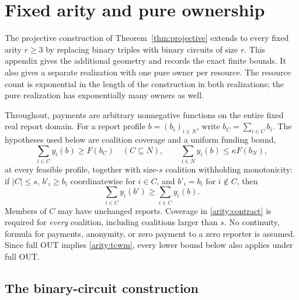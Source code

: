 \section{Fixed arity and pure ownership}
\label{sec:arity}
\label{arity:appendix}

The projective construction of Theorem~\ref{thm:projective} extends to every
fixed arity $r\geq 3$ by
replacing binary triples with binary circuits of size $r$.  This appendix
gives the additional geometry and records the exact finite bounds.  It also
gives a separate realization with one pure owner per resource.  The resource
count is exponential in the length of the construction in both realizations;
the pure realization has exponentially many owners as well.

Throughout, payments are arbitrary nonnegative functions on the entire fixed
real report domain.  For a report profile $b=(b_i)_{i\in N}$, write
$b_C=\sum_{i\in C}b_i$.  The hypotheses used below are coalition coverage and
a uniform funding bound,
\begin{equation}
  \sum_{i\in C}y_i(b)\geq F(b_C)\quad(C\subseteq N),
  \qquad
  \sum_{i\in N}y_i(b)\leq\kappa F(b_N),
  \label{arity:contract}
\end{equation}
at every feasible profile, together with size-$s$ coalition withholding
monotonicity: if $|C|\leq s$, $b'_i\geq b_i$ coordinatewise for $i\in C$,
and $b'_i=b_i$ for $i\notin C$, then
\begin{equation}
  \sum_{i\in C}y_i(b')\geq\sum_{i\in C}y_i(b).
  \label{arity:tcwm}
\end{equation}
Members of $C$ may have unchanged reports.  Coverage in
\eqref{arity:contract} is required for \emph{every} coalition, including
coalitions larger than $s$.  No continuity, formula for payments, anonymity,
or zero payment to a zero reporter is assumed.  Since full OUT implies
\eqref{arity:tcwm}, every lower bound below also applies under full OUT.

\subsection{The binary-circuit construction}
\label{arity:construction-section}

